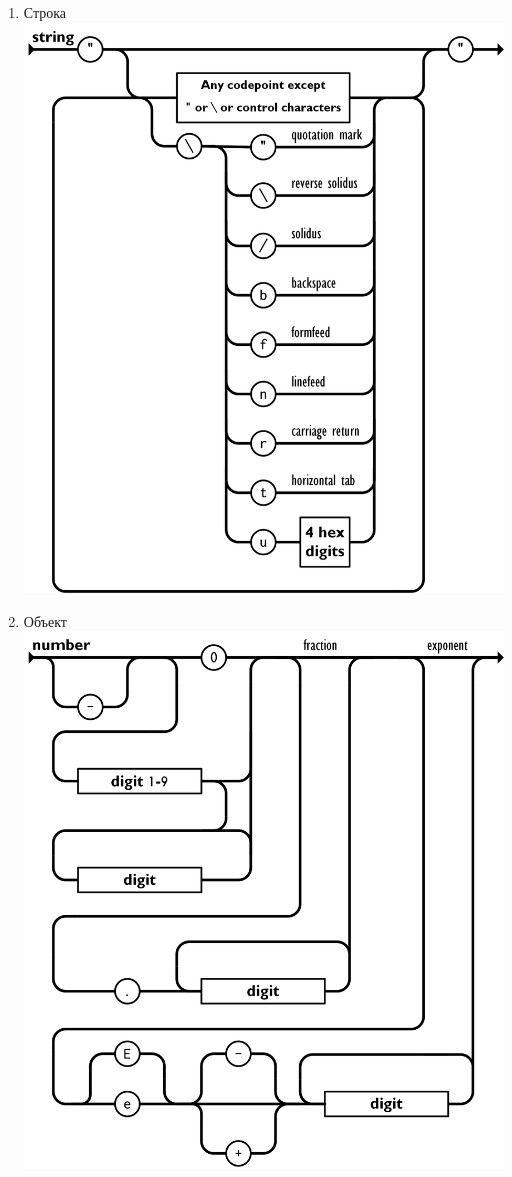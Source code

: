 \documentclass[a4page]{article}
\begin{document}
\begin{enumerate}
	      \newpage
	\item Строка \\
	      \includegraphics[scale=0.6]{string.png}
	      \newpage
	\item Объект \\
	      \includegraphics[scale=0.6]{number.png}

\end{enumerate}
\end{document}

